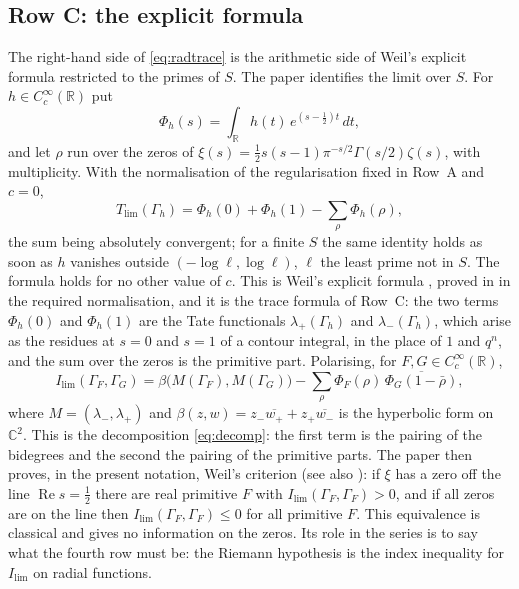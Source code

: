 \documentclass[10pt]{amsart}
\theoremstyle{definition}
\theoremstyle{remark}
\newcommand{\C}{\mathbb C}
\newcommand{\R}{\mathbb R}
\newcommand{\Rel}{\operatorname{Re}}
\newcommand{\Tl}{T_{\lim}}
\newcommand{\Il}{I_{\lim}}
\begin{document}
\subsection{Row C: the explicit formula}
The right-hand side of \eqref{eq:radtrace} is the arithmetic side of Weil's explicit formula
restricted to the primes of $S$. The paper \cite{Paper45} identifies the limit over $S$. For
$h\in C_c^\infty(\R)$ put
\[
 \Phi_h(s)=\int_{\R}h(t)\,e^{(s-\frac12)t}\,dt ,
\]
and let $\rho$ run over the zeros of $\xi(s)=\tfrac12s(s-1)\pi^{-s/2}\Gamma(s/2)\zeta(s)$, with
multiplicity. With the normalisation of the regularisation fixed in Row~A and $c=0$,
\begin{equation}\label{eq:EF}
 \Tl(\Gamma_h)=\Phi_h(0)+\Phi_h(1)-\sum_\rho\Phi_h(\rho) ,
\end{equation}
the sum being absolutely convergent; for a finite $S$ the same identity holds as soon as $h$
vanishes outside $(-\log\ell,\log\ell)$, $\ell$ the least prime not in $S$. The formula holds for
no other value of $c$. This is Weil's explicit formula \cite{Weil52}, proved in \cite{Paper45}
in the required normalisation, and it is the trace formula of Row~C: the two terms
$\Phi_h(0)$ and $\Phi_h(1)$ are the Tate functionals $\lambda_+(\Gamma_h)$ and
$\lambda_-(\Gamma_h)$, which arise as the residues at $s=0$ and $s=1$ of a contour integral, in
the place of $1$ and $q^n$, and the sum over the zeros is the primitive part. Polarising, for
$F,G\in C_c^\infty(\R)$,
\begin{equation}\label{eq:EFform}
 \Il(\Gamma_F,\Gamma_G)=\beta\bigl(M(\Gamma_F),M(\Gamma_G)\bigr)-\sum_\rho\Phi_F(\rho)\,\overline{\Phi_G(1-\bar\rho)} ,
\end{equation}
where $M=(\lambda_-,\lambda_+)$ and $\beta(z,w)=z_-\overline{w_+}+z_+\overline{w_-}$ is the
hyperbolic form on $\C^2$. This is the decomposition \eqref{eq:decomp}: the first term is the
pairing of the bidegrees and the second the pairing of the primitive parts. The paper then
proves, in the present notation, Weil's criterion (see also \cite{Yoshida1992,Bombieri2000}): if
$\xi$ has a zero off the line $\Rel s=\tfrac12$ there are real primitive $F$ with
$\Il(\Gamma_F,\Gamma_F)>0$, and if all zeros are on the line then
$\Il(\Gamma_F,\Gamma_F)\le0$ for all primitive $F$. This equivalence is classical and gives no
information on the zeros. Its role in the series is to say what the fourth row must be: the
Riemann hypothesis is the index inequality for $\Il$ on radial functions.
\end{document}
